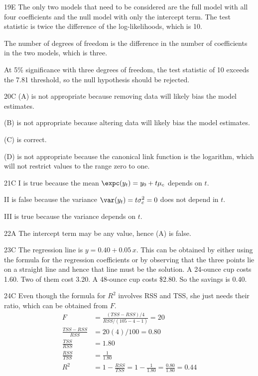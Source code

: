 \begin{solution}{19}{E}
The only two models that need to be considered are the full model with all four coefficients and the null model with only the intercept term. The test statistic is twice the difference of the log-likelihoods, which is 10.

The number of degrees of freedom is the difference in the number of coefficients in the two models, which is three.

At 5\% significance with three degrees of freedom, the test statistic of 10 exceeds the 7.81 threshold, so the null hypothesis should be rejected.
\end{solution}

\begin{solution}{20}{C}
(A) is not appropriate because removing data will likely bias the model estimates.

(B) is not appropriate because altering data will likely bias the model estimates.

(C) is correct.

(D) is not appropriate because the canonical link function is the logarithm, which will not restrict values to the range zero to one.
\end{solution}

\begin{solution}{21}{C}
I is true because the mean $\expc(y_t) = y_0 + t\mu_c$ depends on $t$.

II is false because the variance $\var(y_t) = t\sigma_c^2 = 0$ does not depend in $t$.

III is true because the variance depends on $t$.
\end{solution}

\begin{solution}{22}{A}
The intercept term may be any value, hence (A) is false.
\end{solution}

\begin{solution}{23}{C}
The regression line is $y = 0.40 + 0.05\,x$. This can be obtained by either using the formula for the regression coefficients or by observing that the three points lie on a straight line and hence that line must be the solution. A 24-ounce cup costs 1.60. Two of them cost 3.20. A 48-ounce cup costs \$2.80. So the savings is 0.40.
\end{solution}

\begin{solution}{24}{C}
Even though the formula for $R^2$ involves RSS and TSS, she just needs their ratio, which can be obtained from $F$.
\begin{align*}
F &= \frac{(TSS - RSS)/4}{RSS/(105 - 4 - 1)} = 20 \\
\frac{TSS - RSS}{RSS} &= 20(4)/100 = 0.80 \\
\frac{TSS}{RSS} &= 1.80 \\
\frac{RSS}{TSS} &= \frac{1}{1.80} \\
R^2 &= 1 - \frac{RSS}{TSS} = 1 - \frac{1}{1.80} = \frac{0.80}{1.80} = 0.44
\end{align*}
\end{solution}


